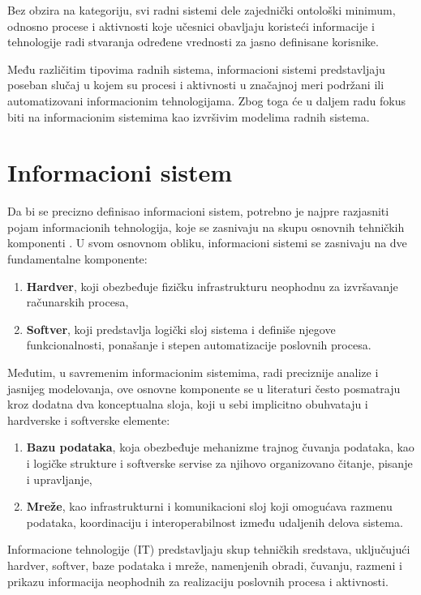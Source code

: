 Bez obzira na kategoriju, svi radni sistemi dele zajednički ontološki minimum, odnosno procese i aktivnosti koje učesnici obavljaju koristeći informacije i tehnologije radi stvaranja određene vrednosti za jasno definisane korisnike.

Među različitim tipovima radnih sistema, informacioni sistemi predstavljaju poseban slučaj u kojem su procesi i aktivnosti u značajnoj meri podržani ili automatizovani informacionim tehnologijama. Zbog toga će u daljem radu fokus biti na informacionim sistemima kao izvršivim modelima radnih sistema.

\section{Informacioni sistem}
Da bi se precizno definisao informacioni sistem, potrebno je najpre razjasniti pojam informacionih tehnologija, koje se zasnivaju na skupu osnovnih tehničkih komponenti \cite{laudon2004management}. U svom osnovnom obliku, informacioni sistemi se zasnivaju na dve fundamentalne komponente:
\begin{enumerate}
\item \textbf{Hardver}, koji obezbeđuje fizičku infrastrukturu neophodnu za izvršavanje računarskih procesa,
\item \textbf{Softver}, koji predstavlja logički sloj sistema i definiše njegove funkcionalnosti, ponašanje i stepen automatizacije poslovnih procesa.
\end{enumerate}

Međutim, u savremenim informacionim sistemima, radi preciznije analize i jasnijeg modelovanja, ove osnovne komponente se u literaturi često posmatraju kroz dodatna dva konceptualna sloja, koji u sebi implicitno obuhvataju i hardverske i softverske elemente:

\begin{enumerate}[start=3]
\item \textbf{Bazu podataka}, koja obezbeđuje mehanizme trajnog čuvanja podataka, kao i logičke strukture i softverske servise za njihovo organizovano čitanje, pisanje i upravljanje,
\item \textbf{Mreže}, kao infrastrukturni i komunikacioni sloj koji omogućava razmenu podataka, koordinaciju i interoperabilnost između udaljenih delova sistema.
\end{enumerate}

\begin{definicija}
Informacione tehnologije (IT) predstavljaju skup tehničkih sredstava, uključujući hardver, softver, baze podataka i mreže, namenjenih obradi, čuvanju, razmeni i prikazu informacija neophodnih za realizaciju poslovnih procesa i aktivnosti.
\end{definicija}

